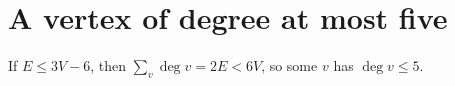 \section{A vertex of degree at most five}

If $E \le 3V-6$, then $\sum_v \deg v = 2E < 6V$, so some $v$ has $\deg v \le 5$.
